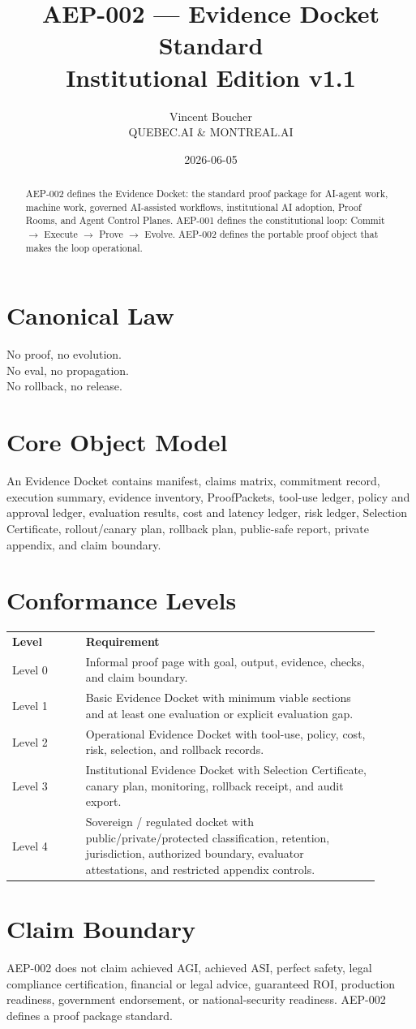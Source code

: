 \documentclass[11pt]{article}
\title{\textbf{AEP-002 --- Evidence Docket Standard}\\\large Institutional Edition v1.1}
\author{Vincent Boucher\\QUEBEC.AI \& MONTREAL.AI}
\date{2026-06-05}
\begin{document}
\maketitle
\begin{abstract}
AEP-002 defines the Evidence Docket: the standard proof package for AI-agent work, machine work, governed AI-assisted workflows, institutional AI adoption, Proof Rooms, and Agent Control Planes. AEP-001 defines the constitutional loop: Commit $\rightarrow$ Execute $\rightarrow$ Prove $\rightarrow$ Evolve. AEP-002 defines the portable proof object that makes the loop operational.
\end{abstract}
\section*{Canonical Law}
No proof, no evolution.\\
No eval, no propagation.\\
No rollback, no release.
\section{Core Object Model}
An Evidence Docket contains manifest, claims matrix, commitment record, execution summary, evidence inventory, ProofPackets, tool-use ledger, policy and approval ledger, evaluation results, cost and latency ledger, risk ledger, Selection Certificate, rollout/canary plan, rollback plan, public-safe report, private appendix, and claim boundary.
\section{Conformance Levels}
\begin{longtable}{p{0.18\linewidth}p{0.72\linewidth}}
\textbf{Level} & \textbf{Requirement}\\
Level 0 & Informal proof page with goal, output, evidence, checks, and claim boundary.\\
Level 1 & Basic Evidence Docket with minimum viable sections and at least one evaluation or explicit evaluation gap.\\
Level 2 & Operational Evidence Docket with tool-use, policy, cost, risk, selection, and rollback records.\\
Level 3 & Institutional Evidence Docket with Selection Certificate, canary plan, monitoring, rollback receipt, and audit export.\\
Level 4 & Sovereign / regulated docket with public/private/protected classification, retention, jurisdiction, authorized boundary, evaluator attestations, and restricted appendix controls.\\
\end{longtable}
\section{Claim Boundary}
AEP-002 does not claim achieved AGI, achieved ASI, perfect safety, legal compliance certification, financial or legal advice, guaranteed ROI, production readiness, government endorsement, or national-security readiness. AEP-002 defines a proof package standard.
\end{document}

